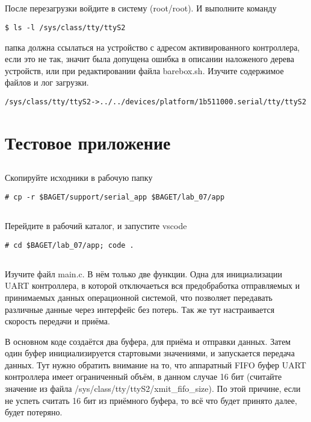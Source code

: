 \subsection{}После перезагрузки войдите в систему (root/root). И выполните команду
\begin{lstlisting}[style=bash]
$ ls -l /sys/class/tty/ttyS2
\end{lstlisting}
папка должна ссылаться на устройство с адресом активированного контроллера, если это не так, значит была допущена ошибка в описании наложеного дерева устройств, или при редактировании файла barebox.sh. Изучите содержимое файлов и лог загрузки.
\begin{lstlisting}[style=stdout]
/sys/class/tty/ttyS2->../../devices/platform/1b511000.serial/tty/ttyS2
\end{lstlisting}

\section{Тестовое приложение}

\subsection{}Скопируйте исходники в рабочую папку
\begin{lstlisting}[style=bash]
# cp -r $BAGET/support/serial_app $BAGET/lab_07/app
\end{lstlisting}

\subsection{}Перейдите в рабочий каталог, и запустите vscode
\begin{lstlisting}[style=bash]
# cd $BAGET/lab_07/app; code .
\end{lstlisting}

\subsection{}Изучите файл main.c. В нём только две функции. Одна для инициализации UART контроллера, в которой отключаеться вся предобработка отправляемых и принимаемых данных операционной системой, что позволяет передавать различные данные через интерфейс без потерь. Так же тут настраивается скорость передачи и приёма. 

В основном коде создаётся два буфера, для приёма и отправки данных. Затем один буфер инициализируется стартовыми значениями, и запускается передача данных. Тут нужно обратить внимание на то, что аппаратный FIFO буфер UART контроллера имеет ограниченный объём, в данном случае 16 бит (считайте значение из файла /sys/class/tty/ttyS2/xmit\_fifo\_size). По этой причине, если не успеть считать 16 бит из приёмного буфера, то всё что будет принято далее, будет потеряно.

